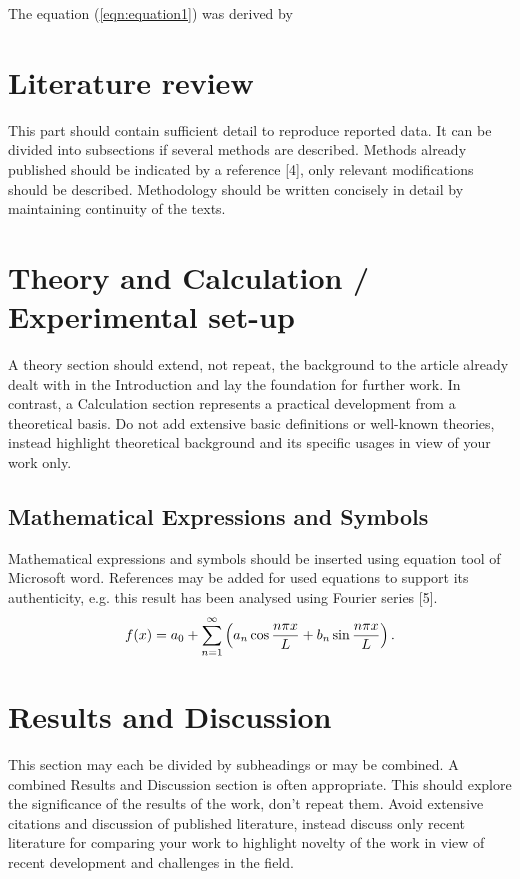 \documentclass[11pt,twocolumn]{article}
\begin{document}
The equation (\ref{eqn:equation1}) was derived by 


\section{Literature review}
This part should contain sufficient detail to reproduce reported data. It can be divided into subsections if several methods are described. Methods already published should be indicated by a reference [4], only relevant modifications should be described. Methodology should be written concisely in detail by maintaining continuity of the texts. 

\section{Theory and Calculation / Experimental set-up}

A theory section should extend, not repeat, the background to the article already dealt with in the Introduction and lay the foundation for further work. In contrast, a Calculation section represents a practical development from a theoretical basis. Do not add extensive basic definitions or well-known theories, instead highlight theoretical background and its specific usages in view of your work only.
\subsection{Mathematical Expressions and Symbols}
Mathematical expressions and symbols should be inserted using equation tool of Microsoft word. References may be added for used equations to support its authenticity, e.g. this result has been analysed using Fourier series [5].
\begin{equation}
f(x) = a_0 + \sum_{n=1}^\infty \left( a_n \cos {n\pi x\over L} + b_n \sin {n\pi x \over L} \right).
\end{equation}

\section{Results and Discussion}
This section may each be divided by subheadings or may be combined.  A combined Results and Discussion section is often appropriate.  This should explore the significance of the results of the work, don’t repeat them. Avoid extensive citations and discussion of published literature, instead discuss only recent literature for comparing your work to highlight novelty of the work in view of recent development and challenges in the field.
\end{document}

